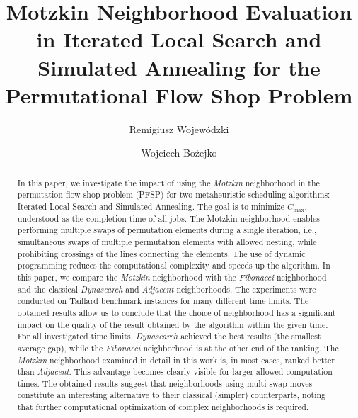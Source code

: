 \documentclass[runningheads]{llncs}
\begin{document}
\title{Motzkin Neighborhood Evaluation in Iterated Local Search
and Simulated Annealing for the Permutational
Flow Shop Problem}



\author{Remigiusz Wojew\'{o}dzki \and Wojciech Bo\.{z}ejko}

\maketitle           

\begin{abstract}
In this paper, we investigate the impact of using the \emph{Motzkin} neighborhood in the permutation flow shop problem (PFSP) for two metaheuristic scheduling algorithms: Iterated Local Search and Simulated Annealing. The goal is to minimize $C_{\max}$, understood as the completion time of all jobs. The Motzkin neighborhood enables performing multiple swaps of permutation elements during a single iteration, i.e., simultaneous swaps of multiple permutation elements with allowed nesting, while prohibiting crossings of the lines connecting the elements. The use of dynamic programming reduces the computational complexity and speeds up the algorithm. In this paper, we compare the \emph{Motzkin} neighborhood with the \emph{Fibonacci} neighborhood and the classical \emph{Dynasearch} and \emph{Adjacent} neighborhoods. The experiments were conducted on Taillard benchmark instances for many different time limits. The obtained results allow us to conclude that the choice of neighborhood has a significant impact on the quality of the result obtained by the algorithm within the given time. For all investigated time limits, \emph{Dynasearch} achieved the best results (the smallest average gap), while the \emph{Fibonacci} neighborhood is at the other end of the ranking. The \emph{Motzkin} neighborhood examined in detail in this work is, in most cases, ranked better than \emph{Adjacent}. This advantage becomes clearly visible for larger allowed computation times. The obtained results suggest that neighborhoods using multi-swap moves constitute an interesting alternative to their classical (simpler) counterparts, noting that further computational optimization of complex neighborhoods is required.

\end{abstract}
\end{document}

